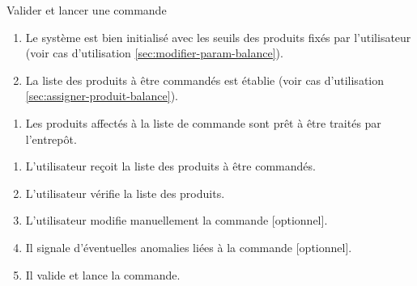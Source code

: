 ﻿\begin{UseCase}{Valider et lancer une commande}



\begin{UseCasePre}
    \begin{enumerate}
        \item Le système est bien initialisé avec les seuils des produits fixés
            par l'utilisateur (voir cas d'utilisation
            \ref{sec:modifier-param-balance}).
        \item La liste des produits à être commandés est établie (voir cas
            d'utilisation \ref{sec:assigner-produit-balance}).
    \end{enumerate}
\end{UseCasePre}

\begin{UseCasePost}
    \begin{enumerate}
        \item Les produits affectés à la liste de commande sont prêt à être
            traités par l'entrepôt.
    \end{enumerate}
\end{UseCasePost}

\begin{UseCaseScenario}
    \begin{enumerate}
        \item L'utilisateur reçoit la liste des produits à être commandés.
        \item L'utilisateur vérifie la liste des produits.
        \item L'utilisateur modifie manuellement la commande [optionnel].
        \item Il signale d'éventuelles anomalies liées à la commande [optionnel].
        \item Il valide et lance la commande.
    \end{enumerate}
\end{UseCaseScenario}


\end{UseCase}

